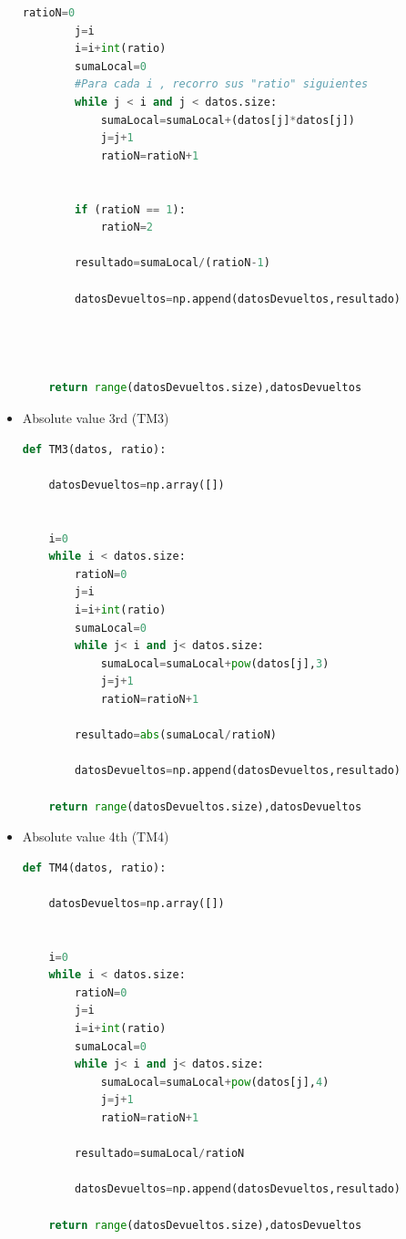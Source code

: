 \begin{itemize}
\begin{lstlisting}[language=Python]
        ratioN=0
        j=i
        i=i+int(ratio)
        sumaLocal=0
        #Para cada i , recorro sus "ratio" siguientes
        while j < i and j < datos.size:
            sumaLocal=sumaLocal+(datos[j]*datos[j])
            j=j+1
            ratioN=ratioN+1
         
        
        if (ratioN == 1):
            ratioN=2
            
        resultado=sumaLocal/(ratioN-1)
        
        datosDevueltos=np.append(datosDevueltos,resultado)
            
    
    

    return range(datosDevueltos.size),datosDevueltos
\end{lstlisting}

\item Absolute value 3rd (TM3)
\begin{lstlisting}[language=Python]
def TM3(datos, ratio):
    
    datosDevueltos=np.array([])
    
    
    i=0
    while i < datos.size:
        ratioN=0
        j=i
        i=i+int(ratio)
        sumaLocal=0
        while j< i and j< datos.size:
            sumaLocal=sumaLocal+pow(datos[j],3)
            j=j+1
            ratioN=ratioN+1
            
        resultado=abs(sumaLocal/ratioN)
        
        datosDevueltos=np.append(datosDevueltos,resultado)
        
    return range(datosDevueltos.size),datosDevueltos
\end{lstlisting}
\newpage
\item Absolute value 4th (TM4)
\begin{lstlisting}[language=Python]
def TM4(datos, ratio):
    
    datosDevueltos=np.array([])
    
    
    i=0
    while i < datos.size:
        ratioN=0
        j=i
        i=i+int(ratio)
        sumaLocal=0
        while j< i and j< datos.size:
            sumaLocal=sumaLocal+pow(datos[j],4)
            j=j+1
            ratioN=ratioN+1
            
        resultado=sumaLocal/ratioN
        
        datosDevueltos=np.append(datosDevueltos,resultado)
        
    return range(datosDevueltos.size),datosDevueltos
\end{lstlisting}


\end{itemize}
